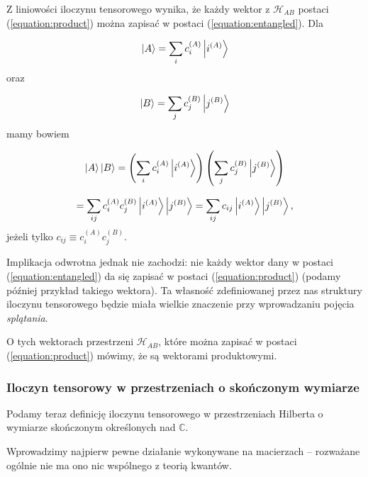 \begin{remark}
    \label{remark:classes}
    Z liniowości iloczynu tensorowego wynika, że każdy wektor z $\mathcal{H}_{AB}$ postaci (\ref{equation:product}) można zapisać w postaci (\ref{equation:entangled}). Dla

    $$
        \ket{A} = \sum\limits_{i} c_i ^ {(A)} \ket{i^{(A)}}
    $$
    oraz

    $$
        \ket{B} = \sum\limits_{j} c_j ^ {(B)} \ket{j^{(B)}}
    $$
    mamy bowiem

    $$
        \ket{A} \ket{B} = \left(\sum\limits_{i} c_i ^ {(A)} \ket{i^{(A)}}\right) \left(\sum\limits_{j} c_j ^ {(B)} \ket{j^{(B)}}\right)
    $$

    $$
        = \sum\limits_{ij} c_{i} ^ {(A)} c_{j} ^ {(B)} \ket{i ^ {(A)}} \ket{j ^ {(B)}} = \sum\limits_{ij} c_{ij} \ket{i ^ {(A)}} \ket{j ^ {(B)}},
    $$
    jeżeli tylko $c_{ij} \equiv c_{i} ^ {(A)} c_{j} ^ {(B)}$.

    Implikacja odwrotna jednak nie zachodzi: nie każdy wektor dany w postaci (\ref{equation:entangled}) da się zapisać w postaci (\ref{equation:product}) (podamy później przykład takiego wektora). Ta własność zdefiniowanej przez nas struktury iloczynu tensorowego będzie miała wielkie znaczenie przy wprowadzaniu pojęcia \textit{splątania}.
\end{remark}

\begin{remark}
    \label{remark:product-vector}
    O tych wektorach przestrzeni $\mathcal{H}_{AB}$, które można zapisać w postaci (\ref{equation:product}) mówimy, że są wektorami produktowymi.
\end{remark}

\subsubsection{Iloczyn tensorowy w przestrzeniach o skończonym wymiarze}

Podamy teraz definicję iloczynu tensorowego w przestrzeniach Hilberta o wymiarze skończonym określonych nad $\mathbb{C}$.

Wprowadzimy najpierw pewne działanie wykonywane na macierzach -- rozważane ogólnie nie ma ono nic wspólnego z teorią kwantów.

